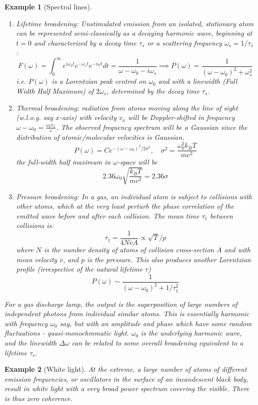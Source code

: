 \documentclass[a4paper]{article}
\newtheorem{eg}{Example}[section]
\theoremstyle{new}
\begin{document}
\begin{eg}[Spectral lines]\leavevmode
\begin{enumerate}
    \item Lifetime broadening: Unstimulated emission from an isolated, stationary atom can be represented semi-classically as a decaying harmonic wave, beginning at $t = 0$ and characterized by a decay time $\tau_s$ or a scattering frequency $\omega_s = 1/\tau_s$:
    $$F(\omega)=\int_0^\infty e^{i\omega_0t}e^{-\omega_st}e^{-i\omega t}dt=\frac{1}{\omega-\omega_0-i\omega_s}\implies P(\omega)=\frac{1}{(\omega-\omega_0)^2+\omega_s^2}$$
    i.e. $P(\omega)$ is a Lorentzian peak centred on $\omega_0$ and with a linewidth (Full Width Half Maximum) of $2\omega_s$, determined by the decay time $\tau_s$.
    \item Thermal broadening: radiation from atoms moving along the line of sight (w.l.o.g. say $x$-axis) with velocity $v_x$ will be Doppler-shifted in frequency $\omega-\omega_0=\frac{\omega_0v_x}{c}$. The observed frequency spectrum will be a Gaussian since the distribution of atomic/molecular velocities is Gaussian.
    $$P(\omega)=Ce^{-(\omega-\omega_0)^2/2\sigma^2},\quad\sigma^2=\frac{\omega_0^2k_BT}{mc^2}$$
    the full-width half maximum in $\omega$-space will be
    $$2.36\omega_0\sqrt{\frac{k_BT}{mc^2}}=2.36\sigma$$
    \item Pressure broadening: In a gas, an individual atom is subject to collisions with other atoms, which at the very least perturb the phase correlation of the emitted wave before and after each collision. The mean time $\tau_1$ between collisions is:
    $$\tau_1=\frac{1}{4N\overline{v}A}\propto\sqrt{T}/p$$
    where $N$ is the number density of atoms of collision cross-section $A$ and with mean velocity $\overline{v}$, and $p$ is the pressure. This also produces another Lorentzian profile (irrespective of the natural lifetime $\tau$)
    $$P(\omega)\sim\frac{1}{(\omega-\omega_0)^2+1/\tau_1^2}$$
\end{enumerate}
For a gas discharge lamp, the output is the superposition of large numbers of independent photons from individual similar atoms. This is essentially harmonic with frequency $\omega_0$ say, but with an amplitude and phase which have some random fluctuations - quasi-monochromatic light. $\omega_0$ is the underlying harmonic wave, and the linewidth $\Delta\omega$ can be related to some overall broadening equivalent to a lifetime $\tau_s$.
\end{eg}
\begin{eg}[White light]
At the extreme, a large number of atoms of different emission frequencies, or oscillators in the surface of an incandescent black body, result in white light with a very broad power spectrum covering the visible. There is thus zero coherence.
\end{eg}
\end{document}
